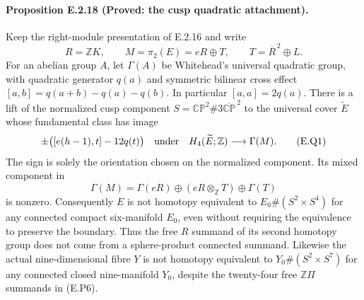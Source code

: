 \paragraph{Proposition E.2.18 (Proved: the cusp quadratic attachment).}
Keep the right-module presentation of E.2.16 and write
\[
 R=\mathbb ZK,\qquad M=\pi_2(E)=eR\oplus T,
 \qquad T=\overline R^{\,2}\oplus L.
\]
For an abelian group $A$, let $\Gamma(A)$ be Whitehead's universal
quadratic group, with quadratic generator $q(a)$ and symmetric
bilinear cross effect
$[a,b]=q(a+b)-q(a)-q(b)$.  In particular $[a,a]=2q(a)$.
There is a lift of the normalized cusp component
$S=\mathbb {CP}^2\#3\overline{\mathbb {CP}}^{\,2}$ to the
universal cover $\widetilde E$ whose fundamental class has image
\[
 \pm\bigl([e(h-1),t]-12q(t)\bigr)
       \quad\hbox{under}\quad
 H_4(\widetilde E;\mathbb Z)\longrightarrow\Gamma(M).
 \tag{E.Q1}
\]
The sign is solely the orientation chosen on the normalized
component.  Its mixed component in
\[
 \Gamma(M)=\Gamma(eR)\oplus(eR\otimes_{\mathbb Z}T)
                                      \oplus\Gamma(T)
 \tag{E.Q2}
\]
is nonzero.  Consequently $E$ is not homotopy equivalent to
$E_0\#(S^2\times S^4)$ for any connected compact six-manifold
$E_0$, even without requiring the equivalence to preserve the
boundary.  Thus the free $R$ summand of its second homotopy group
does not come from a sphere-product connected summand.
Likewise the actual nine-dimensional fibre $Y$ is not
homotopy equivalent to $Y_0\#(S^2\times S^7)$ for any
connected closed nine-manifold $Y_0$, despite the twenty-four
free $\mathbb Z\Pi$ summands in (E.P6).

